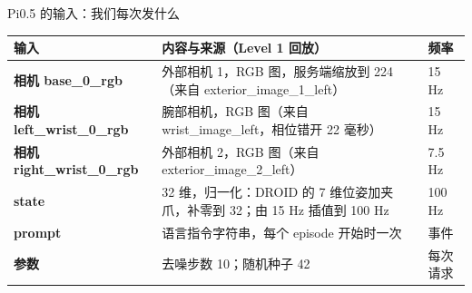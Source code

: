 
\begin{frame}[t]{Pi0.5 的输入：我们每次发什么}
\scriptsize
\renewcommand{\arraystretch}{1.05}
\setlength{\tabcolsep}{3pt}
\begin{tabularx}{\textwidth}{>{\bfseries}p{2.6cm} Y p{1.5cm}}
\toprule
{}
输入 & 内容与来源（Level 1 回放） & 频率 \\
\midrule
相机 base\_0\_rgb & 外部相机 1，RGB 图，服务端缩放到 224（来自 exterior\_image\_1\_left） & 15 Hz \\
相机 left\_wrist\_0\_rgb & 腕部相机，RGB 图（来自 wrist\_image\_left，相位错开 22 毫秒） & 15 Hz \\
相机 right\_wrist\_0\_rgb & 外部相机 2，RGB 图（来自 exterior\_image\_2\_left） & 7.5 Hz \\
state & 32 维，归一化：DROID 的 7 维位姿加夹爪，补零到 32；由 15 Hz 插值到 100 Hz & 100 Hz \\
prompt & 语言指令字符串，每个 episode 开始时一次 & 事件 \\
参数 & 去噪步数 10；随机种子 42 & 每次请求 \\
\bottomrule
\end{tabularx}
\par{}
\par{}
\end{frame}

